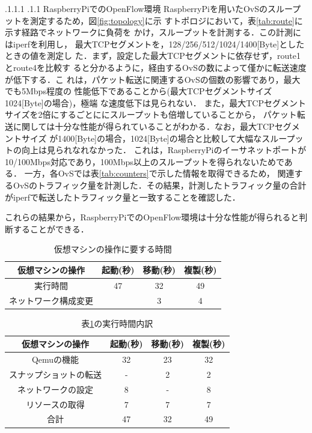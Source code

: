 \documentclass[a4paper, twocolumn]{jarticle}
\makeatletter
\def\subsection{\@startsection{subsection}{1}{\z@}%
 {.1\Cvs \@plus.1\Cdp \@minus.1\Cdp}%
 {.1\Cvs \@plus.1\Cdp}%
 {\normalfont\normalsize\bfseries}}
\makeatother
\begin{document}
\subsection{RaspberryPiでのOpenFlow環境}
RaspberryPiを用いたOvSのスループットを測定するため，図\ref{fig:topology}に示
すトポロジにおいて，表\ref{tab:route}に示す経路でネットワークに負荷を
かけ，スループットを計測する．この計測にはiperf\cite{iperf}を利用し，
最大TCPセグメントを，128/256/512/1024/1400[Byte]としたときの値を測定し
た．まず，設定した最大TCPセグメントに依存せず，route1とroute4を比較す
ると分かるように，経由するOvSの数によって僅かに転送速度が低下する．こ
れは，パケット転送に関連するOvSの個数の影響であり，最大でも5Mbps程度の
性能低下であることから(最大TCPセグメントサイズ1024[Byte]の場合)，極端
な速度低下は見られない．
また，最大TCPセグメントサイズを2倍にするごとににスループットも倍増していることから，
パケット転送に関しては十分な性能が得られていることがわかる．なお，最大TCPセグメントサイズ
が1400[Byte]の場合，1024[Byte]の場合と比較して大幅なスループットの向上は見られなれなかった．
これは，RaspberryPiのイーサネットポートが10/100Mbps対応であり，100Mbps以上のスループットを得られないためである．
一方，各OvSでは表\ref{tab:counters}で示した情報を取得できるため，
関連するOvSのトラフィック量を計測した．その結果，計測したトラフィック量の合計がiperfで転送したトラフィック量と一致することを確認した．

これらの結果から，RaspberryPiでのOpenFlow環境は十分な性能が得られると判断することができる．

\begin{table}[t]
	\centering
	\caption{仮想マシンの操作に要する時間}
	\label{tab:func_time}
	\vspace{4mm}
    \scalebox{1.0}
	{
		\begin{tabular}{|c|c|c|c|} \hline
            仮想マシンの操作& 起動(秒) & 移動(秒) & 複製(秒) \\ \hline \hline
            実行時間 & 47 & 32 & 49 \\ \hline
            ネットワーク構成変更 & & 3 & 4 \\ \hline
	  	\end{tabular}
	}
\end{table}

\begin{table}[t]
	\centering
	\caption{表\ref{tab:func_time}の実行時間内訳}
	\label{tab:func_breakdown}
	\vspace{4mm}
    \scalebox{1.0}
	{
		\begin{tabular}{|c|c|c|c|} \hline
            仮想マシンの操作& 起動(秒) & 移動(秒) & 複製(秒) \\ \hline \hline
						Qemuの機能 & 32 & 23 & 32 \\ \hline
						スナップショットの転送 & - & 2 & 2 \\ \hline
						ネットワークの設定 & 8 & - & 8 \\ \hline
						リソースの取得 & 7 & 7 & 7 \\ \hline
            合計 & 47 & 32 & 49 \\ \hline
	  	\end{tabular}
	}
\end{table}
\end{document}

